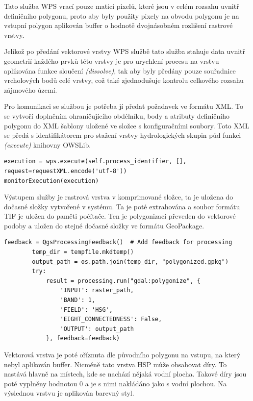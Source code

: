 \documentclass[a4paper,oneside,12pt]{book}
\begin{document}
 \hspace{10mm}Tato služba WPS vrací pouze matici pixelů, které jsou v celém rozsahu uvnitř definičního polygonu, proto aby byly použity pixely na obvodu polygonu je na vstupní polygon aplikován buffer o hodnotě dvojnásobném rozlišení rastrové vrstvy. 

 \hspace{10mm} Jelikož po předání vektorové vrstvy WPS službě tato služba stahuje data uvnitř geometrií každého prvků této vrstvy je pro urychlení procesu na vrstvu aplikována funkce sloučení \textit{(dissolve)}, tak aby byly předány pouze souřadnice vrcholových bodů celé vrstvy, což také zjednodušuje kontrolu celkového rozsahu zájmového území.

  \hspace{10mm} Pro komunikaci se službou je potřeba jí předat požadavek ve formátu XML. To se vytvoří doplněním ohraničujícího obdélníku, body a atributy definičního polygonu do XML šablony uložené ve složce s konfiguračními soubory. Toto XML se předá s identifikátorem pro stažení vrstvy hydrologických skupin půd funkci \textit{(execute)} knihovny OWSLib.
\begin{lstlisting}[style=mypython, caption={Spuštění kominukace s WPS službou},label={kod:wps}]
execution = wps.execute(self.process_identifier, [], request=requestXML.encode('utf-8'))
monitorExecution(execution)
\end{lstlisting}

\hspace{10mm}Výstupem služby je rastrová vrstva v komprimované složce, ta je uložena do dočasné složky vytvořené v systému. Ta je poté extrahována a soubor formátu TIF je uložen do paměti počítače. Ten je polygonizací převeden do vektorové podoby a uložen do stejné dočasné složky ve formátu GeoPackage.

\begin{lstlisting}[style=mypython, caption={Polygonizace rastrové vrstvy},label={kod:polygonizace}]
feedback = QgsProcessingFeedback()  # Add feedback for processing
        temp_dir = tempfile.mkdtemp()
        output_path = os.path.join(temp_dir, "polygonized.gpkg")
        try:
            result = processing.run("gdal:polygonize", {
                'INPUT': raster_path,
                'BAND': 1,
                'FIELD': 'HSG',
                'EIGHT_CONNECTEDNESS': False,
                'OUTPUT': output_path
            }, feedback=feedback)
\end{lstlisting}

\hspace{10mm}Vektorová vrstva je poté oříznuta dle původního polygonu na vstupu, na který nebyl aplikován buffer. Nicméně tato vrstva HSP může obsahovat díry. To nastává hlavně na místech, kde se nachází nějaká vodní plocha. Takové díry jsou poté vyplněny hodnotou 0 a je s nimi nakládáno jako s vodní plochou. Na výslednou vrstvu je aplikován barevný styl.
\end{document}
